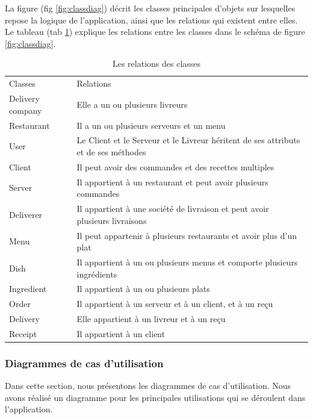 \documentclass[french, a4paper, 12pt]{report}
\begin{document}
			La figure (fig \ref{fig:classdiag}) décrit les classes principales d'objets sur lesquelles repose la logique de l'application, ainsi que les relations qui existent entre elles.
			\newpage
			Le tableau (tab \ref{tab:classdiag}) explique les relations entre les classes dans le schéma de figure \ref{fig:classdiag}.
			
			\begin{table}[!h!]
  				\begin{tabular}{lp{10cm}}
    					Classes & Relations \\
    					Delivery company & Elle a un ou plusieurs livreurs \\
				\hline
				Restaurant  &  Il a un ou plusieurs serveurs et un menu \\
				\hline
				User & Le Client et le Serveur et le Livreur héritent de ses attributs et de ses méthodes \\
				\hline
				Client & Il peut avoir des commandes et des recettes multiples \\
				\hline
				Server & Il appartient à un restaurant et peut avoir plusieurs commandes \\
				\hline
				Deliverer & Il appartient à une société de livraison et peut avoir plusieurs livraisons \\
				\hline
				Menu & Il peut appartenir à plusieurs restaurants et avoir plus d’un plat \\
				\hline
				Dish & Il appartient à un ou plusieurs menus et comporte plusieurs ingrédients \\
				\hline
				Ingredient & Il appartient à un ou plusieurs plats \\
				\hline
				Order & Il appartient à un serveur et à un client, et à un reçu \\
				\hline
				Delivery & Elle appartient à un livreur et à un reçu \\
				\hline
				Receipt & Il appartient à un client \\
  				\end{tabular}
  				\caption{Les relations des classes}
  				\label{tab:classdiag}
			\end{table}

		\newpage
		\subsubsection{Diagrammes de cas d’utilisation} Dans cette section, nous présentons les diagrammes de cas d'utilisation. Nous avons réalisé un diagramme pour les principales utilisations qui se déroulent dans l'application. 
		
\end{document}
